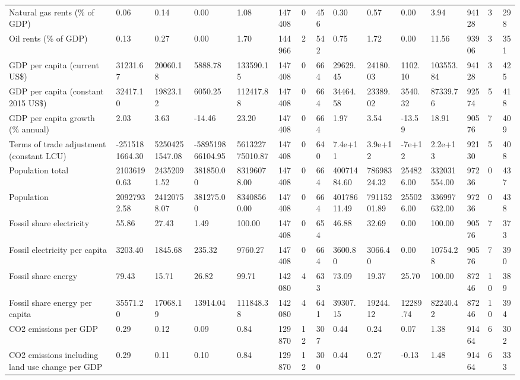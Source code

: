 \begin{longtable}{lllllllllllllll}
\addlinespace
Natural gas rents (\% of GDP) & 0.06 & 0.14 & 0.00 & 1.08 & 147408 & 0 & 456 & 0.30 & 0.57 & 0.00 & 3.94 & 94128 & 3 & 298\\
Oil rents (\% of GDP) & 0.13 & 0.27 & 0.00 & 1.70 & 144966 & 2 & 542 & 0.75 & 1.72 & 0.00 & 11.56 & 93906 & 3 & 351\\
GDP per capita (current US\$) & 31231.67 & 20060.18 & 5888.78 & 133590.15 & 147408 & 0 & 664 & 29629.45 & 24180.03 & 1102.10 & 103553.84 & 94128 & 3 & 425\\
GDP per capita (constant 2015 US\$) & 32417.10 & 19823.12 & 6050.25 & 112417.88 & 147408 & 0 & 664 & 34464.58 & 23389.02 & 3540.32 & 87339.76 & 92574 & 5 & 418\\
GDP per capita growth (\% annual) & 2.03 & 3.63 & -14.46 & 23.20 & 147408 & 0 & 664 & 1.97 & 3.54 & -13.59 & 18.91 & 90576 & 7 & 409\\
\addlinespace
Terms of trade adjustment (constant LCU) & -2515181664.30 & 52504251547.08 & -589519866104.95 & 561322775010.87 & 147408 & 0 & 640 & 7.4e+11 & 3.9e+12 & -7e+12 & 2.2e+13 & 92130 & 5 & 408\\
Population total & 21036190.63 & 24352091.52 & 381850.00 & 83196078.00 & 147408 & 0 & 664 & 40071484.60 & 78698324.32 & 254826.00 & 332031554.00 & 97236 & 0 & 437\\
Population & 20927932.58 & 24120758.07 & 381275.00 & 83408560.00 & 147408 & 0 & 664 & 40178611.49 & 79115201.89 & 255026.00 & 336997632.00 & 97236 & 0 & 438\\
Fossil share electricity & 55.86 & 27.43 & 1.49 & 100.00 & 147408 & 0 & 654 & 46.88 & 32.69 & 0.00 & 100.00 & 90576 & 7 & 373\\
Fossil electricity per capita & 3203.40 & 1845.68 & 235.32 & 9760.27 & 147408 & 0 & 664 & 3600.80 & 3066.40 & 0.00 & 10754.28 & 90576 & 7 & 390\\
\addlinespace
Fossil share energy & 79.43 & 15.71 & 26.82 & 99.71 & 142080 & 4 & 633 & 73.09 & 19.37 & 25.70 & 100.00 & 87246 & 10 & 389\\
Fossil share energy per capita & 35571.20 & 17068.19 & 13914.04 & 111848.38 & 142080 & 4 & 641 & 39307.15 & 19244.12 & 12289.74 & 82240.42 & 87246 & 10 & 394\\
CO2 emissions per GDP & 0.29 & 0.12 & 0.09 & 0.84 & 129870 & 12 & 307 & 0.44 & 0.24 & 0.07 & 1.38 & 91464 & 6 & 302\\
CO2 emissions including land use change per GDP & 0.29 & 0.11 & 0.10 & 0.84 & 129870 & 12 & 300 & 0.44 & 0.27 & -0.13 & 1.48 & 91464 & 6 & 333\\

\end{longtable}
